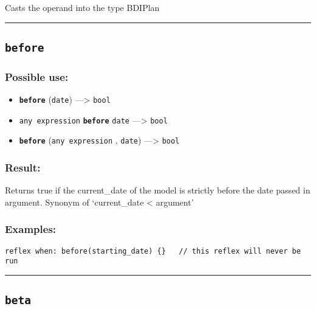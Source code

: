 \documentclass[]{book}
\providecommand{\tightlist}{%
  \setlength{\itemsep}{0pt}\setlength{\parskip}{0pt}}
\theoremstyle{definition}
\theoremstyle{definition}
\theoremstyle{definition}
\theoremstyle{remark}
\begin{document}
Casts the operand into the type BDIPlan

\begin{center}\rule{0.5\linewidth}{\linethickness}\end{center}

\subsection{\texorpdfstring{\texttt{before}}{before}}\label{before}

\subsubsection{Possible use:}\label{possible-use-64}

\begin{itemize}
\tightlist
\item
  \textbf{\texttt{before}} (\texttt{date}) ---\textgreater{}
  \texttt{bool}
\item
  \texttt{any\ expression} \textbf{\texttt{before}} \texttt{date}
  ---\textgreater{} \texttt{bool}
\item
  \textbf{\texttt{before}} (\texttt{any\ expression} , \texttt{date})
  ---\textgreater{} \texttt{bool}
\end{itemize}

\subsubsection{Result:}\label{result-63}

Returns true if the current\_date of the model is strictly before the
date passed in argument. Synonym of `current\_date \textless{} argument'

\subsubsection{Examples:}\label{examples-51}

\begin{verbatim}
reflex when: before(starting_date) {}   // this reflex will never be run 
\end{verbatim}

\begin{center}\rule{0.5\linewidth}{\linethickness}\end{center}

\subsection{\texorpdfstring{\texttt{beta}}{beta}}\label{beta}
\end{document}
